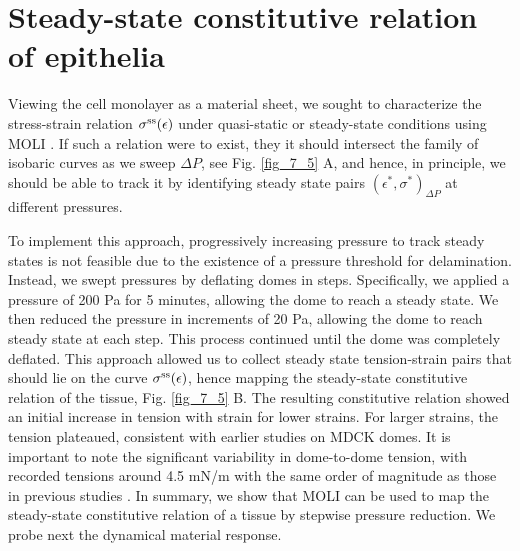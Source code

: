 \hypertarget{constitutive-relation-of-epithelia}{%
	\section{Steady-state constitutive relation of
		epithelia}\label{constitutive-relation-of-epithelia}}

Viewing the cell monolayer as a material sheet, we sought to characterize the stress-strain relation $\sigma^{\rm ss}(\epsilon)$ under quasi-static or steady-state conditions using MOLI \cite{latorre2018,duque2023}. If such a relation were to exist, they it should intersect the family of isobaric curves as we sweep $\Delta P$, see Fig. \ref{fig_7_5} A, and hence, in principle, we should be able to track it by identifying steady state pairs  $(\epsilon^*, \sigma^*)_{\Delta P}$ at different pressures.

To implement this approach, progressively increasing pressure to track steady states is not feasible due to the existence of a pressure threshold for delamination. Instead, we swept pressures by deflating domes in steps. Specifically, we applied a pressure of 200 \unit{\pascal} for 5 minutes, allowing the dome to reach a steady state. We then reduced the pressure in increments of 20 \unit{\pascal}, allowing the dome to reach steady state at each step. This process continued until the dome was completely deflated. This approach allowed us to collect steady state tension-strain pairs that should lie on the curve $\sigma^{\rm ss}(\epsilon)$, hence mapping the steady-state constitutive relation of the tissue, Fig. \ref{fig_7_5} B. The resulting constitutive relation showed an initial increase in tension with strain for lower strains. For larger strains, the tension plateaued, consistent with earlier studies on MDCK domes. It is important to note the significant variability in dome-to-dome tension, with recorded tensions around 4.5 \unit{mN/m} with the same order of magnitude as those in previous studies \cite{latorre2018,marin-llaurado2022}. In summary, we show that MOLI can be used to map the steady-state constitutive relation of a tissue by stepwise pressure reduction. We probe next the dynamical material response.

